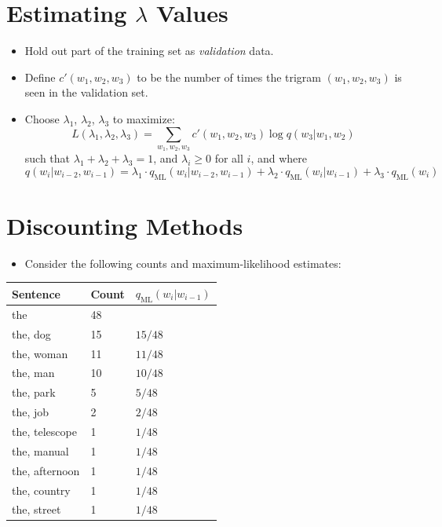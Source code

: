 \documentclass{book}
\begin{document}
\section{Estimating $\lambda$ Values}
\begin{itemize}
  \item Hold out part of the training set as \textit{validation} data.
  \item Define $c'(w_1, w_2, w_3)$ to be the number of times the trigram $(w_1, w_2, w_3)$ is seen in the validation set.
  \item Choose $\lambda_1$, $\lambda_2$, $\lambda_3$ to maximize:
  \[
  L(\lambda_1, \lambda_2, \lambda_3) = \sum_{w_1,w_2,w_3} c'(w_1, w_2, w_3) \log q(w_3 | w_1, w_2)
  \]
  such that $\lambda_1 + \lambda_2 + \lambda_3 = 1$, and $\lambda_i \geq 0$ for all $i$, and where
  \[
  q(w_i | w_{i-2}, w_{i-1}) = \lambda_1 \cdot q_{\text{ML}}(w_i | w_{i-2}, w_{i-1}) + \lambda_2 \cdot q_{\text{ML}}(w_i | w_{i-1}) + \lambda_3 \cdot q_{\text{ML}}(w_i)
  \]
\end{itemize}



\section{Discounting Methods}

\begin{itemize}
\item Consider the following counts and maximum-likelihood estimates:
\end{itemize}

\begin{table}[h]
    \centering
    \begin{tabular}{lll}
        \textbf{Sentence} & \textbf{Count} & \textbf{$q_{\text{ML}}(w_i | w_{i-1})$} \\
        \hline
        the & 48 & \\
        the, dog & 15 & $15/48$ \\
        the, woman & 11 & $11/48$ \\
        the, man & 10 & $10/48$ \\
        the, park & 5 & $5/48$ \\
        the, job & 2 & $2/48$ \\
        the, telescope & 1 & $1/48$ \\
        the, manual & 1 & $1/48$ \\
        the, afternoon & 1 & $1/48$ \\
        the, country & 1 & $1/48$ \\
        the, street & 1 & $1/48$ \\
    \end{tabular}
\end{table}
\end{document}
